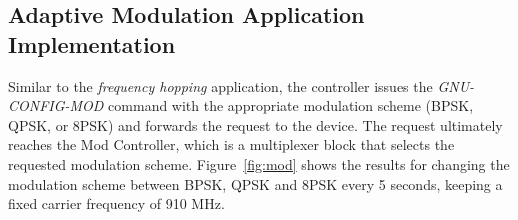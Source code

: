 \subsection{Adaptive Modulation  Application Implementation}

Similar to the \emph{frequency hopping} application, the controller issues the \emph{GNU-CONFIG-MOD} command with the appropriate modulation scheme (BPSK, QPSK, or 8PSK) and forwards the request to the device. The request ultimately reaches the Mod Controller, which is a multiplexer block that selects the requested modulation scheme. Figure~\ref{fig:mod} shows the results for changing the modulation scheme between BPSK, QPSK and 8PSK every 5 seconds, keeping a fixed carrier frequency of 910 MHz.
